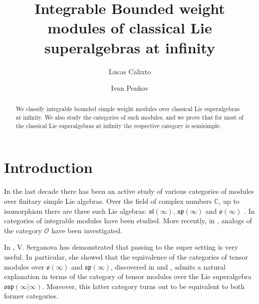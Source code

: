 \documentclass[12pt]{amsart}
\newcommand\C{\mathbb{C}}
\newcommand\fsl{\mathfrak{sl}}
\newcommand\fsp{\mathfrak{sp}}
\newcommand\fosp{\mathfrak{osp}}
\newcommand\fo{\mathfrak{o}}
\newcommand\cO{\mathcal{O}}
\theoremstyle{plain}
\theoremstyle{definition}
\numberwithin{equation}{section}
\begin{document}
%
\title[Integrable Bounded weight modules of Lie superalgebras at infinity]{Integrable Bounded weight modules of classical Lie superalgebras at infinity}
\author{Lucas Calixto}
\address{L.~Calixto: Department of Mathematics, Federal university of Minas Gerais, Belo Horizonte, Brazil}

\author{Ivan Penkov}
\address{I.~Penkov: Jacobs University Bremen Campus Ring 1, 28759 Bremen, Germany}






\begin{abstract}
We classify integrable bounded simple weight modules over classical Lie superalgebras at infinity. We also study the categories of such modules, and we prove that for most of the classical Lie superalgebras at infinity the respective category is semisimple.
\end{abstract}

\maketitle \thispagestyle{empty}


%
\section{Introduction}
In the last decade there has been an active study of various categories of modules over finitary simple Lie algebras. Over the field of complex numbers $\C$, up to isomorphism there are three such Lie algebras: $\fsl(\infty)$, $\fsp(\infty)$ and $\fo(\infty)$ \cite{Bar99}. In \cite{PS11, D-CPS16} categories of integrable modules have been studied. More recently, in \cite{Nam17, CP20, PS19}, analogs of the category $\cO$ have been investigated. 

In \cite{Ser11}, V. Serganova has demonstrated that passing to the super setting is very useful. In particular, she showed that the equivalence of the categories of tensor modules over $\fo(\infty)$ and $\fsp(\infty)$, discovered in \cite{SS15} and \cite{D-CPS16}, admits a natural explanation in terms of the category of tensor modules over the Lie superalgebra $\fosp(\infty | \infty)$. Moreover, this latter category turns out to be equivalent to both former categories.
\end{document}
